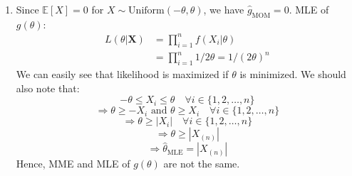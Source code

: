 \documentclass[11pt]{article}
\newcommand{\mom}[1]{\hat{#1}_{\text{MOM}}}
\newcommand{\mle}[1]{\hat{#1}_{\text{MLE}}}
\begin{document}
\begin{enumerate}
\begin{enumerate}
      \item[(ii)] Since $\mathbb{E}[X] = 0$ for $X \sim \text{Uniform}(-\theta, \theta)$, we have $\mom{g} = 0$.
      MLE of $g(\theta)$:
      \begin{align*}
        L(\theta|\boldsymbol{X}) &= \prod_{i = 1}^{n} f(X_i | \theta) \\
        &= \prod_{i = 1}^{n} 1 / 2\theta = 1 / (2\theta)^n
      \end{align*}
      We can easily see that likelihood is maximized if $\theta$ is minimized.
      We should also note that:
      \[-\theta \le X_i \le \theta \quad \forall i \in \{1, 2, \dots, n\}\]
      \[\Rightarrow \theta \ge -X_i \text{ and } \theta \ge X_i \quad \forall i \in \{1, 2, \dots, n\}\]
      \[\Rightarrow \theta \ge |X_i| \quad \forall i \in \{1, 2, \dots, n\}\]
      \[\Rightarrow \theta \ge |X_{(n)}|\]
      \[\Rightarrow \mle{\theta} = |X_{(n)}|\]
      Hence, MME and MLE of $g(\theta)$ are not the same.


\end{enumerate}
\end{enumerate}
\end{document}
